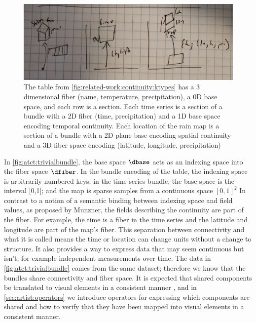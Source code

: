 \documentclass[journal]{IEEEtran}
\theoremstyle{definition}
\theoremstyle{remark}
\begin{document}
\begin{figure}[H]
  \includegraphics[width=\columnwidth]{dbundle.png}
  \caption{The table from \autoref{fig:related-work:continuity:ktypes} has a 3 dimensional fiber (name, temperature, precipitation), a 0D base space, and each row is a section. Each time series is a section of a bundle with a 2D fiber (time, precipitation) and a 1D base space encoding temporal continuity. Each location of the rain map is a section of a bundle with a 2D plane base encoding spatial continuity and a 3D fiber space encoding (latitude, longitude, precipitation)
    \label{fig:atct:trivialbundle}}
\end{figure}

In \autoref{fig:atct:trivialbundle}, the base space $\dbase$ acts as an indexing space into the fiber space $\dfiber$. In the bundle encoding of the table, the indexing space is arbitrarily numbered keys; in the time series bundle, the base space is the interval [0,1]; and the map is sparse samples from a continuous space $[0,1]^{2}$ In contrast to a notion of a semantic binding between indexing space and field values, as proposed by Munzner\cite{munznerVisualizationAnalysisDesign2014}, the fields describing the continuity are part of the fiber. For example, the time is a fiber in the time series and the latitude and longitude are part of the map's fiber. This separation between connectivity and what it is called means the time or location can change units without a change to structure. It also provides a way to express data that may seem continuous but isn't, for example independent measurements over time. The data in \autoref{fig:atct:trivialbundle} comes from the same dataset; therefore we know that the bundles share connectivity and fiber space. It is expected that shared components be translated to visual elements in a consistent manner \cite{hullmanKeeping2018}, and in \autoref{sec:artist:operators} we introduce operators for expressing which components are shared and how to verify that they have been mapped into visual elements in a consistent manner.
\end{document}
